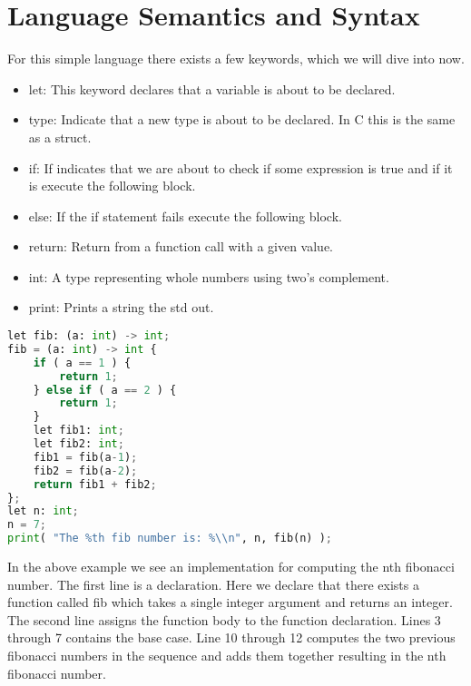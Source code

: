 \section*{Language Semantics and Syntax}
For this simple language there exists a few keywords, which we will dive into now.

\begin{itemize}
  \item let: This keyword declares that a variable is about to be declared.
  \item type: Indicate that a new type is about to be declared. In C this is the same as a struct.
  \item if: If indicates that we are about to check if some expression is true and if it is execute the following block.
  \item else: If the if statement fails execute the following block.
  \item return: Return from a function call with a given value.
  \item int: A type representing whole numbers using two's complement.
  \item print: Prints a string the std out.
\end{itemize}



\begin{lstlisting}[language=Python,title=Fibonacci Example]
let fib: (a: int) -> int;
fib = (a: int) -> int {
    if ( a == 1 ) {
        return 1;
    } else if ( a == 2 ) {
        return 1;
    }
    let fib1: int;
    let fib2: int;
    fib1 = fib(a-1);
    fib2 = fib(a-2);
    return fib1 + fib2; 
};
let n: int;
n = 7;
print( "The %th fib number is: %\\n", n, fib(n) );
\end{lstlisting}

In the above example we see an implementation for computing the nth fibonacci number. The first line is a declaration. Here we declare that there exists a function called fib which takes a single integer argument and returns an integer. The second line assigns the function body to the function declaration. Lines 3 through 7 contains the base case. Line 10 through 12 computes the two previous fibonacci numbers in the sequence and adds them together resulting in the nth fibonacci number. 